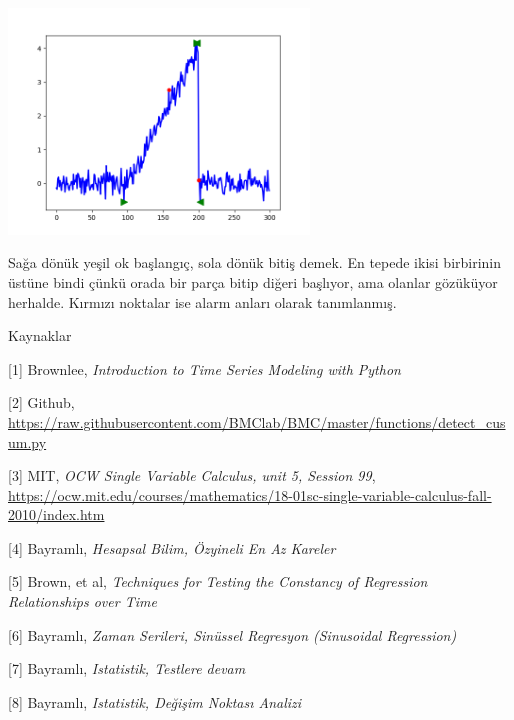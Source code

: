 \documentclass[12pt,fleqn]{article}\usepackage{../../common}
\begin{document}
\includegraphics[height=6cm]{tser_022_de_06.png}

Sağa dönük yeşil ok başlangıç, sola dönük bitiş demek. En tepede ikisi
birbirinin üstüne bindi çünkü orada bir parça bitip diğeri başlıyor, ama olanlar
gözüküyor herhalde. Kırmızı noktalar ise alarm anları olarak tanımlanmış. 

Kaynaklar

[1] Brownlee, {\em Introduction to Time Series Modeling with Python}

[2] Github, \url{https://raw.githubusercontent.com/BMClab/BMC/master/functions/detect_cusum.py}

[3] MIT, {\em OCW Single Variable Calculus, unit 5, Session 99},
         \url{https://ocw.mit.edu/courses/mathematics/18-01sc-single-variable-calculus-fall-2010/index.htm}

[4] Bayramlı, {\em Hesapsal Bilim, Özyineli En Az Kareler}
         
[5] Brown, et al, {\em Techniques for Testing the Constancy of Regression Relationships over Time}

[6] Bayramlı, {\em Zaman Serileri, Sinüssel Regresyon (Sinusoidal Regression)}

[7] Bayramlı, {\em Istatistik, Testlere devam}

[8] Bayramlı, {\em Istatistik, Değişim Noktası Analizi}
\end{document}
